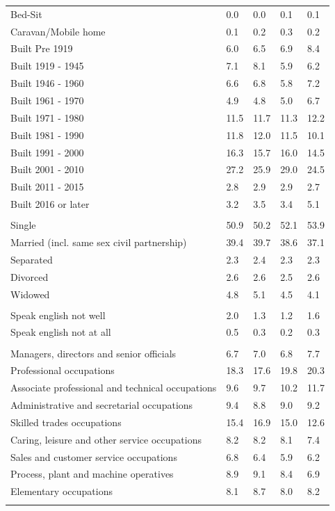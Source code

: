 \documentclass{article}
\begin{document}
\begin{table}[h]
\begin{tabular}{KTTTT}
Bed-Sit & 0.0& 0.0& 0.1& 0.1\\
Caravan/Mobile home & 0.1& 0.2& 0.3& 0.2\\
    \hline
Built Pre 1919 & 6.0& 6.5& 6.9& 8.4\\
Built 1919 - 1945 & 7.1& 8.1& 5.9& 6.2\\
Built  1946 - 1960 & 6.6& 6.8& 5.8& 7.2\\
Built  1961 - 1970 & 4.9& 4.8& 5.0& 6.7\\
Built  1971 - 1980 & 11.5& 11.7& 11.3& 12.2\\
Built  1981 - 1990 & 11.8& 12.0& 11.5& 10.1\\
Built  1991 - 2000 & 16.3& 15.7& 16.0& 14.5\\
Built  2001 - 2010 & 27.2& 25.9& 29.0& 24.5\\
Built  2011 - 2015 & 2.8& 2.9& 2.9& 2.7\\
Built  2016 or later & 3.2& 3.5& 3.4& 5.1\\
\hline
    \\
    \hline
Single & 50.9& 50.2& 52.1& 53.9\\
Married (incl. same sex civil partnership) & 39.4& 39.7& 38.6& 37.1\\
Separated  & 2.3& 2.4& 2.3& 2.3\\
Divorced  & 2.6& 2.6& 2.5& 2.6\\
Widowed & 4.8& 5.1& 4.5& 4.1\\
\hline
    \\ 
    \hline
Speak english not well & 2.0& 1.3& 1.2& 1.6\\
Speak english not at all & 0.5& 0.3& 0.2& 0.3\\
\hline
    \\
    \hline
Managers, directors and senior officials & 6.7& 7.0& 6.8& 7.7\\
Professional occupations & 18.3& 17.6& 19.8& 20.3\\
Associate professional and technical occupations &  9.6&  9.7& 10.2& 11.7\\
Administrative and secretarial occupations & 9.4& 8.8& 9.0& 9.2\\
Skilled trades occupations & 15.4& 16.9& 15.0& 12.6\\
Caring, leisure and other service occupations & 8.2& 8.2& 8.1& 7.4\\
Sales and customer service occupations & 6.8& 6.4& 5.9& 6.2\\
Process, plant and machine operatives & 8.9& 9.1& 8.4& 6.9\\
Elementary occupations & 8.1& 8.7& 8.0& 8.2\\
\hline
\end{tabular}
\end{table}
\end{document}
